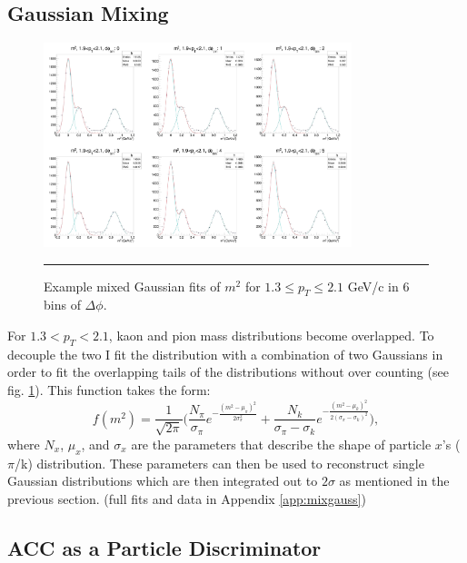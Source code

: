 \subsection{Gaussian Mixing}
\begin{figure}[htbp!]
  \centering
    \includegraphics[width=0.8\textwidth]{lowptfits/yieldvsdphi_tof1_cent0_ch1_pT-19-21.jpg}
    \rule{35em}{0.5pt}
  \caption[Example mixed Gaussian fits of $m^2$ for $1.3 \leq p_T\leq 2.1$ GeV/c in 6 bins of $\Delta \phi$.]{Example mixed Gaussian fits of $m^2$ for $1.3 \leq p_T\leq 2.1$ GeV/c in 6 bins of $\Delta \phi$.}
  \label{fig:mixgausm2}
\end{figure}
For $1.3<p_T<2.1$, kaon and pion mass distributions become overlapped. To decouple the two I fit the distribution with a combination of two Gaussians in order to fit the overlapping tails of the distributions without over counting (see fig. \ref{fig:mixgausm2}). This function takes the form:
\begin{equation}
f(m^2) = \frac{1}{\sqrt{2\pi}} \bigg( \frac{N_{\pi}}{\sigma_{\pi}} e^{-\frac{(m^2-\mu_{\pi})^2}{2\sigma_{\pi}^{2}}} + \frac{N_{k}}{\sigma_{\pi}-\sigma_{k}} e^{-\frac{(m^2-\mu_{k})^2}{2(\sigma_{\pi} - \sigma_{k})^{2}}} \bigg),
\end{equation}
where $N_{x}$, $\mu_x$, and $\sigma_x$ are the parameters that describe the shape of particle $x$'s ($\pi$/k) distribution. These parameters can then be used to reconstruct single Gaussian distributions which are then integrated out to $2\sigma$ as mentioned in the previous section.
(full fits and data in Appendix \ref{app:mixgauss})

\subsection{ACC as a Particle Discriminator}

